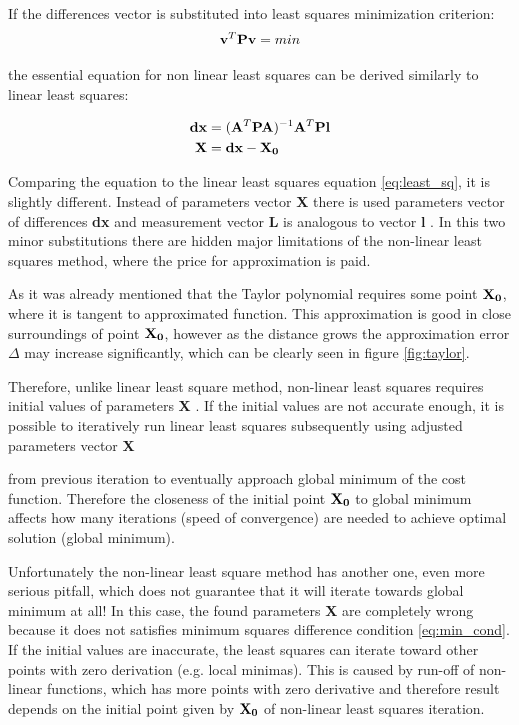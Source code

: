 \documentclass[a4paper,12pt]{article}
\newcommand{\ematr}[1]{
{\bf #1}
}
\newcommand{\evect}[1]{
{\bf #1}
}
\begin{document}
If the differences vector is substituted into least squares minimization criterion:
\begin{equation}
\label{eq:min_cond}
\evect{v}^{T}  \ematr{P} \evect{v} = min
\end{equation}

the essential equation for non linear least squares can be derived 
similarly to linear least squares:

\begin{equation}
\begin{split}
\label{eq:non_least_sq}
\evect{dx} &= (\ematr{A}^{T} \ematr{P} \ematr{A})^{-1} \ematr{A}^{T} \ematr{P} \ematr{l} \\
\evect{X} &=  {\evect{dx} -  \evect{X_{0}}} \\
\end{split}
\end{equation}


Comparing the equation to the linear least squares equation \eqref{eq:least_sq},
 it is slightly different. Instead of parameters vector \evect{X} there is used 
parameters vector of differences \evect{dx} and measurement vector \evect{L} is analogous to vector \evect{l}. In this two minor 
substitutions there are hidden major limitations of the non-linear least squares method, 
where the price for approximation is paid. 

As it was already mentioned that the Taylor polynomial requires some point $\evect{X_{0}}$, where it is tangent to 
approximated function.
This approximation is good in close surroundings of point $\evect{X_{0}}$, however as the distance 
grows the approximation error $\Delta$ may increase significantly, which can be clearly seen in figure \ref{fig:taylor}.

Therefore, unlike linear least square method, non-linear least squares requires initial 
values of parameters \evect{X}. If the initial values are not accurate 
enough, it is possible to iteratively run linear least squares subsequently using adjusted parameters vector \evect{X}
from previous iteration to eventually approach global minimum of the cost function. 
Therefore the closeness of the initial point $\evect{X_{0}}$ to global minimum affects how many iterations (speed of convergence)
are needed to achieve optimal solution (global minimum).

Unfortunately the non-linear least square method has another one, even more serious pitfall, which 
does not guarantee that it will iterate towards global minimum at all!
In this case, the found parameters \evect{X} are completely wrong because 
it does not satisfies minimum squares difference condition \eqref{eq:min_cond}. If the initial values are 
inaccurate, the least squares can iterate toward other points with zero derivation (e.g. local minimas).  
This is caused by run-off of non-linear functions, which has more points with zero derivative
and therefore result depends on the initial point given by $\evect{X_{0}}$  of non-linear least squares iteration.
\end{document}
